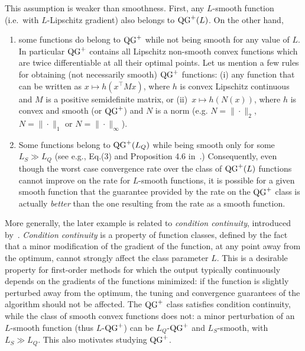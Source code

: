     This assumption is weaker than smoothness.
    First, any $L$-smooth function (i.e.\ with $L$-Lipschitz gradient) also belongs to $\operatorname{QG}^+(L)$.
    On the other hand,
    \begin{enumerate}[itemsep=1pt,topsep=0pt,leftmargin=*]
        \item some functions do belong to $\operatorname{QG}^+$ while not being smooth for any value of $L$.
        In particular $\operatorname{QG}^+$ contains all Lipschitz non-smooth convex functions which are twice differentiable at all their optimal points.
        Let us mention a few rules for obtaining (not necessarily smooth) $\operatorname{QG}^+$ functions:
        (i) any function that can be written as $x\mapsto h(x^\top M x)$, where $h$ is convex Lipschitz continuous and $M$ is a positive semidefinite matrix,
        or (ii)~$x\mapsto h(N(x))$, where $h$ is convex and smooth (or $\operatorname{QG}^+$) and $N$ is a norm (e.g. $N=\|\cdot\|_2$, $N=\|\cdot\|_1$ or $N=\|\cdot\|_\infty$).
        \item Some functions belong to $\operatorname{QG}^+(L_Q)$ while being smooth only for some $L_S \gg L_Q$
        (see e.g., Eq.(3) and Proposition 4.6 in~\citep{guille2021study}.)
        Consequently, even though the worst case convergence rate over the class of $\operatorname{QG}^+(L)$ functions cannot improve on the rate for $L$-smooth functions,
        it is possible for a given smooth function that the guarantee provided by the rate on the $\operatorname{QG}^+$ class is actually \textit{better} than the one resulting from the rate as a smooth function.
    \end{enumerate}

    More generally, the later example is related to \emph{condition continuity}, introduced by~\citet[Definition 4.9]{guille2021study}.
    \textit{Condition continuity} is a property of function classes, defined by the fact that a minor modification of the gradient of the function, at any point away from the optimum, cannot strongly affect the class parameter $L$.
    This is a desirable property for first-order methods for which the output typically continuously depends on the gradients of the functions minimized: if the function is slightly perturbed away from the optimum, the tuning and convergence guarantees of the algorithm should not be affected.
    The $\operatorname{QG}^+$ class satisfies condition continuity, while the class of smooth convex functions does not:
    a minor perturbation of an $L$-smooth function (thus $L$-$\operatorname{QG}^+$) can be $L_Q$-$\operatorname{QG}^+$ and $L_S$-smooth, with $L_S \gg L_Q$.
    This also motivates studying $\operatorname{QG}^+$.

